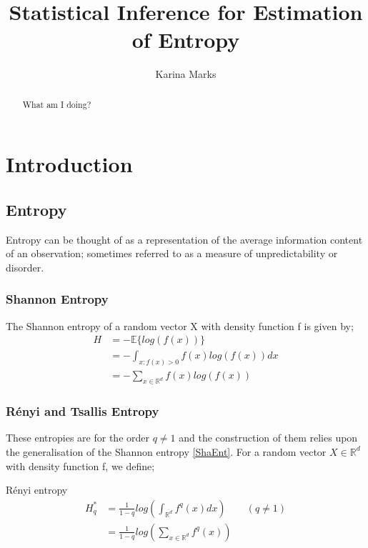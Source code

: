 \documentclass{report}
\title{Statistical Inference for Estimation of Entropy}
\author{Karina Marks}
\begin{document}
\begin{titlepage}
\maketitle
\end{titlepage}

\begin{abstract}
 What am I doing?
\end{abstract}

\tableofcontents


\chapter{Introduction}

\cite{paper1} \cite{paper2} \cite{paper3} \cite{paper4} \cite{paper5} \cite{paper6} \cite{paper7} \cite{paper8} \cite{paper9} \cite{paper10}

\section{Entropy}

Entropy can be thought of as a representation of the average information content of an observation; sometimes referred to as a measure of unpredictability or disorder. 

\subsection{Shannon Entropy}
The Shannon entropy of a random vector X with density function f is given by;
\begin{align} 
H &= - \mathbb{E} \{log(f(x))\} \nonumber \\
&= - \int_{x : f(x) > 0} f(x) log(f(x)) dx \nonumber \\
&= - \sum_{x \in \mathbb{R}^{d}} f(x) log(f(x)) \label{ShaEnt}
\end{align} 

\subsection{ R\'enyi and Tsallis Entropy}
These entropies are for the order $q \neq 1$ and the construction of them relies upon the generalisation of the Shannon entropy \ref{ShaEnt}. For a random vector $X \in \mathbb{R}^d$ with density function f, we define;

R\'enyi entropy
\begin{align} 
H_{q}^{*} &= \frac{1}{1-q} log \left( \int_{\mathbb{R}^d} f^q (x) dx \right) \quad  \quad (q \neq 1) \label{RenEnt} \\
&=  \frac{1}{1-q} log \left( \sum_{x \in \mathbb{R}^{d}} f^q (x) \right) \nonumber 
\end{align}
\end{document}
